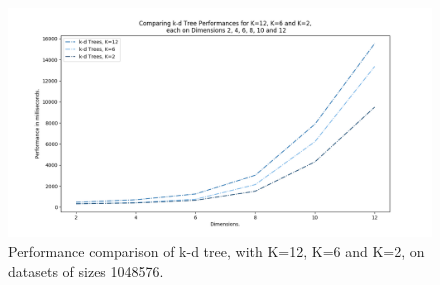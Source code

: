 \begin{figure}[H]
\centering
\includegraphics[width=1.1\textwidth]{pics/plot-figs/kdtree-k2k6k12.png}
\caption{Performance comparison of k-d tree, with K=12, K=6 and K=2, on datasets of sizes 1048576.}
\label{fig:b7}
\end{figure}




















